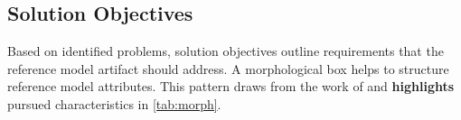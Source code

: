 
\subsection{Solution Objectives}
\label{sec:solobj}


Based on identified problems, solution objectives outline requirements that the reference model artifact should address. A morphological box helps to structure reference model attributes. This pattern draws from the work of \cite{Puster2015} and \textbf{highlights} pursued characteristics in \Tab \ref{tab:morph}.  

